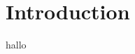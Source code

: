 \documentclass{article}
\begin{document}
\section{Introduction}

hallo \cite{first}

\printbibliography
\end{document}
